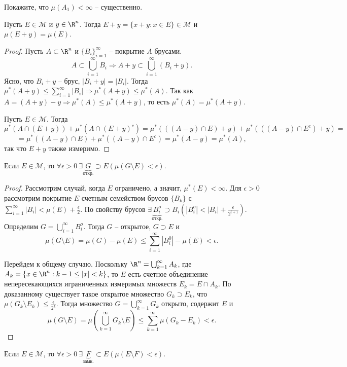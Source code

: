 \begin{problem}
    Покажите, что $\mu(A_{1}) < \infty$ -- существенно.
\end{problem}

\begin{example}
    Пусть $E \in \mathcal{M}$ и $y \in \R^{n}$. Тогда $E + y = \{x + y: x \in E\} \in \mathcal{M}$ и $\mu(E + y) = \mu(E)$.
\end{example}

\begin{proof}
    Пусть $A \subset \R^{n}$ и $\{B_{i}\}_{i = 1}^{\infty}$ -- покрытие $A$ брусами.
    \[A \subset \bigcup_{i = 1}^{\infty} B_{i} \Rightarrow A + y \subset \bigcup_{i = 1}^{\infty}(B_{i} + y).\]
    Ясно, что $B_{i} + y$ -- брус, $|B_{i} + y| = |B_{i}|$. Тогда $\mu^{*}(A + y) \leq \sum_{i = 1}^{\infty}|B_{i}| \Rightarrow \mu^{*}(A + y) \leq \mu^{*}(A)$. Так как $A = (A + y) - y \Rightarrow \mu^{*}(A) \leq \mu^{*}(A + y)$, то есть $\mu^{*}(A) = \mu^{*}(A + y)$.
    
    Пусть $E \in \mathcal{M}$. Тогда
    \[\mu^{*}(A \cap (E + y)) + \mu^{*}(A \cap (E + y)^{c}) = \mu^{*}\left(((A - y) \cap E) + y\right) + \mu^{*}\left(((A - y) \cap E^{c}) + y\right) =\]\[= \mu^{*}\left((A - y) \cap E\right) + \mu^{*}\left((A - y) \cap E^{c}\right) = \mu^{*}(A - y) = \mu^{*}(A),\]
    так что $E + y$ также измеримо.
\end{proof}

\begin{lemma}
    Если $E \in \mathcal{M}$, то $\forall \epsilon > 0 \ \exists \underbrace{G}_{\text{откр.}} \supset E \left(\mu(G \setminus E) < \epsilon\right)$.
\end{lemma}

\begin{proof}
    Рассмотрим случай, когда $E$ ограничено, а значит, $\mu^{*}(E) < \infty$. Для $\epsilon > 0$ рассмотрим покрытие $E$ счетным семейством брусов $\{B_{k}\}$ с $\sum_{i = 1}^{\infty}|B_{i}| < \mu(E) + \frac{\epsilon}{2}$. По свойству брусов $\exists \underbrace{B_{i}^{o}}_{\text{откр.}} \supset B_{i}\left(|B_{i}^{o}| < |B_{i}| + \frac{\epsilon}{2^{i + 1}}\right)$. Определим $G = \bigcup_{i = 1}^{\infty} B_{i}^{o}$. Тогда $G$ -- открытое, $G \supset E$ и 
    \[\mu(G \setminus E) = \mu(G) - \mu(E) \leq \sum_{i = 1}^{\infty}|B_{i}^{0}| - \mu(E) < \epsilon.\]

    Перейдем к общему случаю. Поскольку $\R^{n} = \bigcup_{k = 1}^{\infty}A_{k}$, где $A_{k} = \{x \in \R^{n}: k - 1 \leq |x| < k\}$, то $E$ есть счетное объединение непересекающихся играниченных измеримых множеств $E_{k} = E \cap A_{k}$. По доказанному существует такое открытое множество $G_{k} \supset E_{k}$, что $\mu(G_{k} \setminus E_{k}) \leq \frac{\epsilon}{2^{k}}$. Тогда множество $G = \bigcup_{k = 1}^{\infty}G_{k}$ открыто, содержит $E$ и 
    \[\mu(G \setminus E) = \mu\left(\bigcup_{k = 1}^{\infty} G_{k} \setminus E\right) \leq \sum_{k = 1}^{\infty}\mu(G_{k} - E_{k}) < \epsilon.\]
\end{proof}

\begin{corollary}
    Если $E \in \mathcal{M}$, то $\forall \epsilon > 0 \ \exists \underbrace{F}_{\text{замк.}} \subset E \left(\mu(E \setminus F) < \epsilon\right)$.
\end{corollary}
